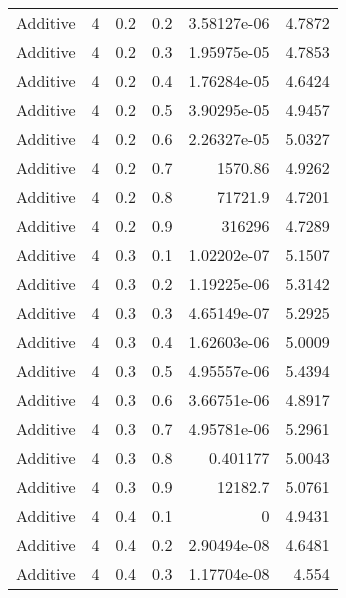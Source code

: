 \documentclass{article}
\begin{document}
\begin{longtable}[H]{lrrrrr}
 Additive       &       4 &   0.2 &            0.2 &      3.58127e-06 &          4.7872 \\
 Additive       &       4 &   0.2 &            0.3 &      1.95975e-05 &          4.7853 \\
 Additive       &       4 &   0.2 &            0.4 &      1.76284e-05 &          4.6424 \\
 Additive       &       4 &   0.2 &            0.5 &      3.90295e-05 &          4.9457 \\
 Additive       &       4 &   0.2 &            0.6 &      2.26327e-05 &          5.0327 \\
 Additive       &       4 &   0.2 &            0.7 &   1570.86        &          4.9262 \\
 Additive       &       4 &   0.2 &            0.8 &  71721.9         &          4.7201 \\
 Additive       &       4 &   0.2 &            0.9 & 316296           &          4.7289 \\
 Additive       &       4 &   0.3 &            0.1 &      1.02202e-07 &          5.1507 \\
 Additive       &       4 &   0.3 &            0.2 &      1.19225e-06 &          5.3142 \\
 Additive       &       4 &   0.3 &            0.3 &      4.65149e-07 &          5.2925 \\
 Additive       &       4 &   0.3 &            0.4 &      1.62603e-06 &          5.0009 \\
 Additive       &       4 &   0.3 &            0.5 &      4.95557e-06 &          5.4394 \\
 Additive       &       4 &   0.3 &            0.6 &      3.66751e-06 &          4.8917 \\
 Additive       &       4 &   0.3 &            0.7 &      4.95781e-06 &          5.2961 \\
 Additive       &       4 &   0.3 &            0.8 &      0.401177    &          5.0043 \\
 Additive       &       4 &   0.3 &            0.9 &  12182.7         &          5.0761 \\
 Additive       &       4 &   0.4 &            0.1 &      0           &          4.9431 \\
 Additive       &       4 &   0.4 &            0.2 &      2.90494e-08 &          4.6481 \\
 Additive       &       4 &   0.4 &            0.3 &      1.17704e-08 &          4.554  \\

\end{longtable}
\end{document}
